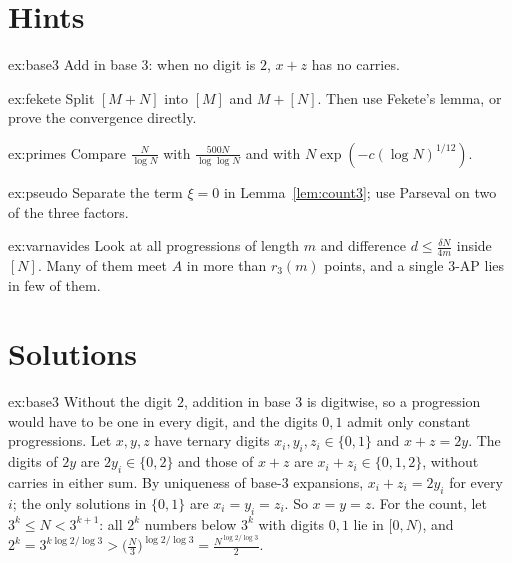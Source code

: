 \section{Hints}

\begin{hint}{ex:base3}
Add in base $3$: when no digit is $2$, $x+z$ has no carries.
\end{hint}

\begin{hint}{ex:fekete}
Split $[M+N]$ into $[M]$ and $M+[N]$. Then use Fekete's lemma, or prove the convergence directly.
\end{hint}

\begin{hint}{ex:primes}
Compare $\frac N{\log N}$ with $\frac{500N}{\log\log N}$ and with $N\exp(-c(\log N)^{1/12})$.
\end{hint}

\begin{hint}{ex:pseudo}
Separate the term $\xi=0$ in Lemma~\ref{lem:count3}; use Parseval on two of the three factors.
\end{hint}

\begin{hint}{ex:varnavides}
Look at all progressions of length $m$ and difference $d\le\frac{\delta N}{4m}$ inside $[N]$. Many of them meet $A$ in more than $r_3(m)$ points, and a single $3$-AP lies in few of them.
\end{hint}

\section{Solutions}

\begin{solution}{ex:base3}
\idea Without the digit $2$, addition in base $3$ is digitwise, so a progression would have to be one in every digit, and the digits $0,1$ admit only constant progressions.
\writeup Let $x,y,z$ have ternary digits $x_i,y_i,z_i\in\{0,1\}$ and $x+z=2y$. The digits of $2y$ are $2y_i\in\{0,2\}$ and those of $x+z$ are $x_i+z_i\in\{0,1,2\}$, without carries in either sum. By uniqueness of base-$3$ expansions, $x_i+z_i=2y_i$ for every $i$; the only solutions in $\{0,1\}$ are $x_i=y_i=z_i$. So $x=y=z$. For the count, let $3^k\le N<3^{k+1}$: all $2^k$ numbers below $3^k$ with digits $0,1$ lie in $[0,N)$, and $2^k=3^{k\log2/\log3}>\bigl(\frac N3\bigr)^{\log2/\log3}=\frac{N^{\log2/\log3}}2$.
\end{solution}

